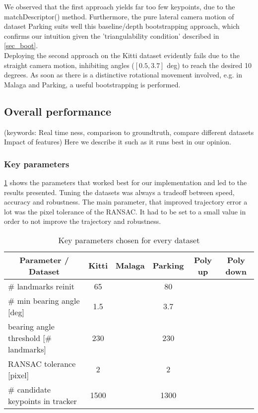 We observed that the first approach yields far too few keypoints, due to the matchDescriptor() method. Furthermore, the pure lateral camera motion of dataset Parking suits well this baseline/depth bootstrapping approach, which confirms our intuition given the 'triangulability condition' described in \cref{sec_boot}.\\

Deploying the second approach on the Kitti dataset evidently fails due to the straight camera motion, inhibiting angles ($[0.5, 3.7]$ deg) to reach the desired 10 degrees. As soon as there is a distinctive rotational movement involved, e.g. in Malaga and Parking, a useful bootstrapping is performed.


\subsection{Overall performance}
(keywords: Real time ness, comparison to groundtruth, compare different datasets
Impact of features) Here we describe it such as it runs best in our opinion.

\subsubsection{Key parameters}
\cref{params_table} shows the parameters that worked best for our implementation and led to the results presented. Tuning the datasets was always a tradeoff between speed, accuracy and robustness. The main parameter, that improved trajectory error a lot was the pixel tolerance of the RANSAC. It had to be set to a small value in order to not improve the trajectory and robustness.
\begin{table}[!h]
	\centering
	\begin{tabular}{|l|c|c|c|c|c|}
	\hline
	\multicolumn{1}{|c|}{\textbf{Parameter / Dataset}} & \textbf{Kitti} & \textbf{Malaga} & \textbf{Parking} & \textbf{Poly up} & \textbf{Poly down} \\ \hline
	\# landmarks reinit                                & 65             &                 & 80               &                  &                    \\ \hline
	\# min bearing angle {[}deg{]}                     & 1.5            &                 & 3.7              &                  &                    \\ \hline
	bearing angle threshold {[}\# landmarks{]}         & 230            &                 & 230              &                  &                    \\ \hline
	RANSAC tolerance {[}pixel{]}                       & 2              &                 & 2                &                  &                    \\ \hline
	\# candidate keypoints in tracker                  & 1500           &                 & 1300             &                  &                    \\ \hline
	\end{tabular}
	\caption{Key parameters chosen for every dataset}
	\label{params_table}
\end{table}

